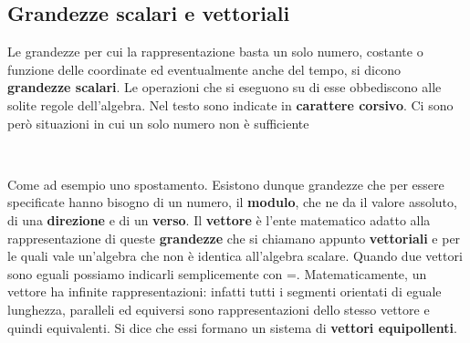 \documentclass{article}
\numberwithin{equation}{subsection}
\begin{document}
\subsection{Grandezze scalari e vettoriali}
Le grandezze per cui la rappresentazione basta un solo numero, costante o funzione delle coordinate ed eventualmente anche del tempo, si dicono \textbf{grandezze scalari}. Le operazioni che si eseguono su di esse obbediscono alle solite regole dell'algebra. Nel testo sono indicate in \textbf{carattere corsivo}. Ci sono però situazioni in cui un solo numero non è sufficiente \\
\begin{center}
     \\
\end{center}
Come ad esempio uno spostamento. Esistono dunque grandezze che per essere specificate hanno bisogno di un numero, il \textbf{modulo}, che ne da il valore assoluto, di una \textbf{direzione} e di un \textbf{verso}. Il \textbf{vettore} è l'ente matematico adatto alla rappresentazione di queste \textbf{grandezze} che si chiamano appunto \textbf{vettoriali} e per le quali vale un'algebra che non è identica all'algebra scalare. Quando due vettori sono eguali possiamo indicarli semplicemente con =. Matematicamente, un vettore ha infinite rappresentazioni: infatti tutti i segmenti orientati di eguale lunghezza, paralleli ed equiversi sono rappresentazioni dello stesso vettore e quindi equivalenti. Si dice che essi formano un sistema di \textbf{vettori equipollenti}.
\end{document}

